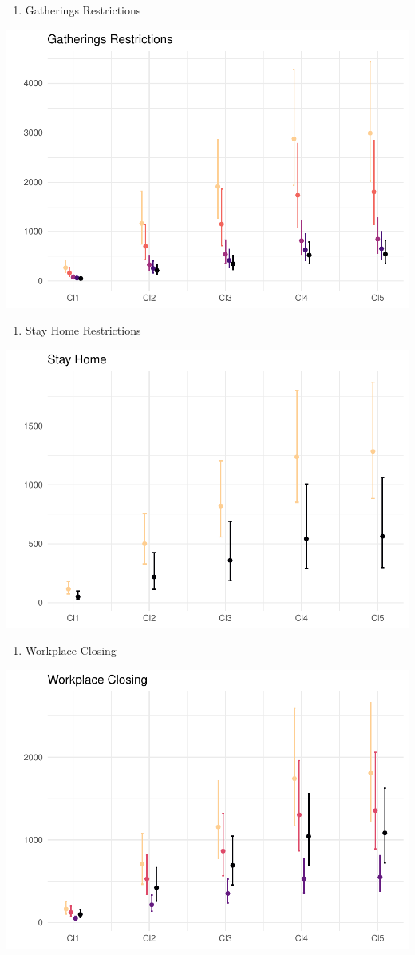 \documentclass[
  6pt,
]{article}
\providecommand{\tightlist}{%
  \setlength{\itemsep}{0pt}\setlength{\parskip}{0pt}}
\begin{document}
\begin{enumerate}
\def\labelenumi{\arabic{enumi}.}
\setcounter{enumi}{2}
\tightlist
\item
  Gatherings Restrictions
\end{enumerate}
\begin{center}
\includegraphics[width=0.7\linewidth]{Report_SC_Group3_files/figure-latex/unnamed-chunk-25-1}
\end{center}
\begin{enumerate}
\def\labelenumi{\arabic{enumi}.}
\setcounter{enumi}{3}
\tightlist
\item
  Stay Home Restrictions
\end{enumerate}
\begin{center}
\includegraphics[width=0.7\linewidth]{Report_SC_Group3_files/figure-latex/unnamed-chunk-26-1}
\end{center}
\begin{enumerate}
\def\labelenumi{\arabic{enumi}.}
\setcounter{enumi}{4}
\tightlist
\item
  Workplace Closing
\end{enumerate}
\begin{center}
\includegraphics[width=0.7\linewidth]{Report_SC_Group3_files/figure-latex/unnamed-chunk-27-1}
\end{center}
\end{document}
